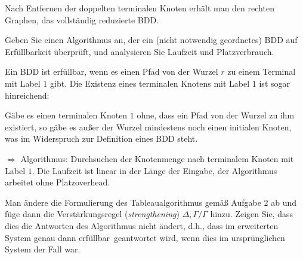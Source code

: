 \begin{minipage}{0.4\textwidth}
\begin{center}
\end{center}
\end{minipage}
\vspace{0.5cm}

Nach Entfernen der doppelten terminalen Knoten erhält man den rechten Graphen, das vollständig reduzierte BDD.

\begin{center}
\colorbox{Golden}{\begin{minipage}{0.95\textwidth}%
    Geben Sie einen Algorithmus an, der ein (nicht notwendig geordnetes) BDD auf Erfüllbarkeit überprüft, und
    analysieren Sie Laufzeit und Platzverbrauch.
\end{minipage}}
\end{center}
\vspace{0.5cm}

Ein BDD ist erfüllbar, wenn es einen Pfad von der Wurzel $r$ zu einem Terminal mit Label $1$ gibt. Die Existenz eines
terminalen Knotens mit Label $1$ ist sogar hinreichend:

Gäbe es einen terminalen Knoten $1$ ohne, dass ein Pfad von der Wurzel zu ihm existiert, so gäbe es außer der Wurzel
mindestens noch einen initialen Knoten, was im Widerspruch zur Definition eines BDD steht.

$\Rightarrow$ Algorithmus: Durchsuchen der Knotenmenge nach terminalem Knoten mit Label $1$. Die Laufzeit ist linear in
der Länge der Eingabe, der Algorithmus arbeitet ohne Platzoverhead.

\begin{center}
\colorbox{Golden}{\begin{minipage}{0.95\textwidth}%
    Man ändere die Formulierung des Tableaualgorithmus gemäß Aufgabe 2 ab und füge dann die Verstärkungsregel
    (\emph{strengthening}) $\Delta,\Gamma/\Gamma$ hinzu. Zeigen Sie, dass dies die Antworten des Algorithmus nicht
    ändert, d.h., dass im erweiterten System genau dann \glqq erfüllbar\grqq\ geantwortet wird, wenn dies im
    ursprünglichen System der Fall war.
\end{minipage}}
\end{center}
\vspace{0.5cm}

